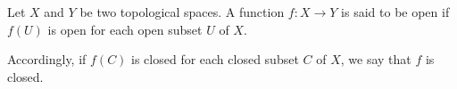 \documentclass[12pt]{article}
\begin{document}
Let $X$ and $Y$ be two topological spaces. A function $f:X\rightarrow Y$ is
said to be open if $f(U)$ is open for each open subset $U$ of $X$.

Accordingly, if $f(C)$ is closed for each closed subset $C$ of $X$, we say that $f$ is closed.
\end{document}
